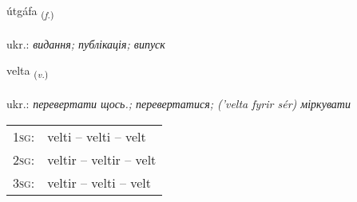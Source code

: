 \documentclass[frontgrid, backgrid]{flacards}\usepackage[]{graphicx}\usepackage[]{xcolor}
\begin{document}
\renewcommand{\flhead}{\vskip5pt \fboxsep=0pt {\small\bfseries\footnotesize Nafnorð | іменник}}
\renewcommand{\fcfoot}{\vskip5pt \fboxsep=0pt \hspace{2pt}{\small\bfseries\footnotesize 1K}}

\renewcommand{\blhead}{\vskip5pt {\small\bfseries\footnotesize Nafnorð | іменник }}
\renewcommand{\bcfoot}{\vskip5pt \hspace{2pt}{\small\bfseries\footnotesize 1K}}


{útgáfa \small{\textsubscript{(\textit{f.})}} \\[1ex] %
\textphonetic{[uːtkauva]} \\
ukr.: \emph{видання; публікація; випуск} \\  [2ex]
\renewcommand*{\arraystretch}{0.8}
}

\renewcommand{\flhead}{\vskip5pt \fboxsep=0pt {\small\bfseries\footnotesize Sagnorð | дієслово}}
\renewcommand{\fcfoot}{\vskip5pt \fboxsep=0pt \hspace{2pt}{\small\bfseries\footnotesize 1K}}

\renewcommand{\blhead}{\vskip5pt {\small\bfseries\footnotesize Sagnorð | дієслово }}
\renewcommand{\bcfoot}{\vskip5pt \hspace{2pt}{\small\bfseries\footnotesize 1K}}


{velta \small{\textsubscript{(\textit{v.})}} \\[1ex] %
\textphonetic{[vɛl̥ta]} \\
ukr.: \emph{перевертати щось.; перевертатися; ('velta fyrir sér) міркувати} \\  [2ex]
\renewcommand*{\arraystretch}{0.8}
\begin{tabular}{p{1cm}l}
\textsc{1sg}: & velti -- velti -- velt \\ 
\textsc{2sg}: & veltir -- veltir -- velt \\ 
\textsc{3sg}: & veltir -- velti -- velt \\ 
\end{tabular}
}
\end{document}
